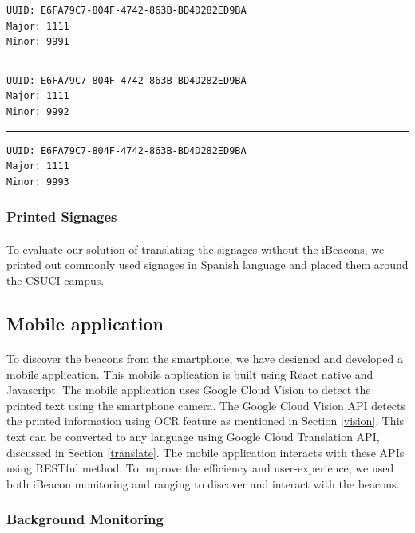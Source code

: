 \documentclass[12pt]{article}
\begin{document}
\begin{lstlisting}
UUID: E6FA79C7-804F-4742-863B-BD4D282ED9BA
Major: 1111
Minor: 9991
\end{lstlisting}

\noindent\rule{13cm}{0.4pt}

\begin{lstlisting}
UUID: E6FA79C7-804F-4742-863B-BD4D282ED9BA
Major: 1111
Minor: 9992
\end{lstlisting}

\noindent\rule{13cm}{0.4pt}

\begin{lstlisting}
UUID: E6FA79C7-804F-4742-863B-BD4D282ED9BA
Major: 1111
Minor: 9993
\end{lstlisting}

\subsubsection{Printed Signages}
\label{printed-signages}
\paragraph{}To evaluate our solution of translating the signages without the iBeacons, we printed out commonly used  signages in Spanish language and placed them around the CSUCI campus. 

\subsection{Mobile application}

\paragraph{}
To discover the beacons from the smartphone, we have designed and developed a mobile application. This mobile application is built using React native and Javascript. The mobile application uses Google Cloud Vision to detect the printed text using the smartphone camera. The Google Cloud Vision API detects the printed information using OCR feature as mentioned in Section  \ref{vision}. This text can be converted to any language using Google Cloud Translation API, discussed in Section \ref{translate}. The mobile application interacts with these APIs using RESTful method. To improve the efficiency and user-experience, we used both iBeacon monitoring and ranging to discover and interact with the beacons.


\subsubsection{Background Monitoring}
\end{document}

